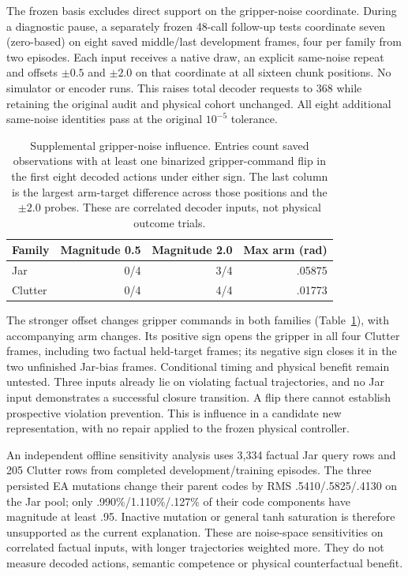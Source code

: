 \documentclass[sigconf,dvipsnames,balance=false]{acmart}
\begin{document}
The frozen basis excludes direct support on the gripper-noise coordinate. During
a diagnostic pause, a separately frozen 48-call follow-up tests coordinate seven
(zero-based) on eight saved middle/last development frames, four per family from
two episodes. Each input receives a native draw, an explicit same-noise repeat
and offsets $\pm0.5$ and $\pm2.0$ on that coordinate at all sixteen chunk positions.
No simulator or encoder runs. This raises total decoder requests to 368 while
retaining the original audit and physical cohort unchanged. All eight additional
same-noise identities pass at the original $10^{-5}$ tolerance.

\begin{table}[t]
\caption{Supplemental gripper-noise influence. Entries count saved observations
with at least one binarized gripper-command flip in the first eight decoded
actions under either sign. The last column is the largest arm-target difference
across those positions and the $\pm2.0$ probes. These are correlated decoder inputs,
not physical outcome trials.}
\label{tab:gripper}
\begin{tabular}{lrrr}
\toprule
Family & Magnitude 0.5 & Magnitude 2.0 & Max arm (rad) \\
\midrule
Jar & 0/4 & 3/4 & .05875 \\
Clutter & 0/4 & 4/4 & .01773 \\
\bottomrule
\end{tabular}
\end{table}

The stronger offset changes gripper commands in both families
(Table~\ref{tab:gripper}), with accompanying arm changes. Its positive sign opens
the gripper in all four Clutter frames, including two factual held-target frames;
its negative sign closes it in the two unfinished Jar-bias frames. Conditional
timing and physical benefit remain untested. Three inputs already lie on violating
factual trajectories, and no Jar input demonstrates a successful closure
transition. A flip there cannot establish prospective violation prevention. This
is influence in a candidate new representation, with no repair applied to the
frozen physical controller.

An independent offline sensitivity analysis uses 3,334 factual Jar query rows and
205 Clutter rows from completed development/training episodes. The three persisted
EA mutations change their parent codes by RMS .5410/.5825/.4130 on the Jar pool;
only .990\%/1.110\%/.127\% of their code components have magnitude at least .95.
Inactive mutation or general tanh saturation is therefore unsupported as the
current explanation. These are noise-space sensitivities on correlated factual
inputs, with longer trajectories weighted more. They do not measure decoded
actions, semantic competence or physical counterfactual benefit.
\end{document}
